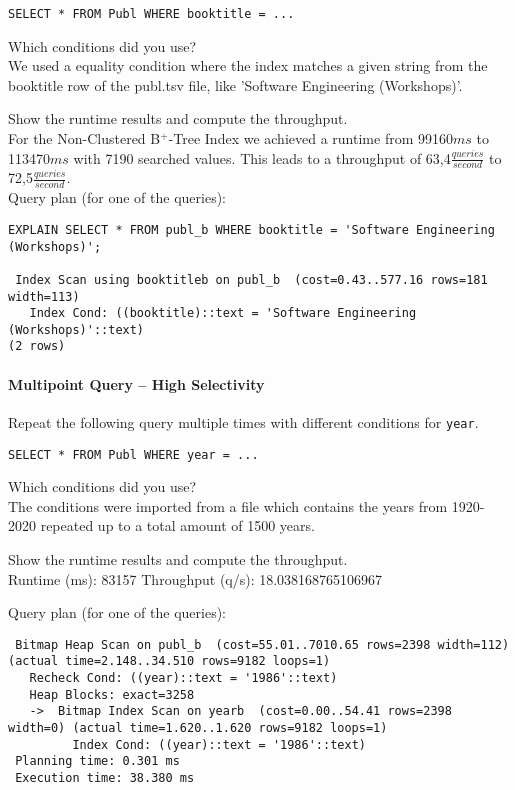\documentclass[11pt]{scrartcl}
\begin{document}
{\small
\begin{verbatim}
SELECT * FROM Publ WHERE booktitle = ...
\end{verbatim}
}

\noindent
Which conditions did you use?\\
We used a equality condition where the index matches a given string from the booktitle row of the publ.tsv file, like 'Software Engineering (Workshops)'.

\smallskip\noindent
Show the runtime results and compute the throughput.\\
For the Non-Clustered B$^+$-Tree Index we achieved a runtime from 99160$ms$ to 113470$ms$ with 7190 searched values.
This leads to a throughput of 63,4$\frac{queries}{second}$ to 72,5$\frac{queries}{second}$.\\

\smallskip\noindent
Query plan (for one of the queries):
\begin{verbatim}
EXPLAIN SELECT * FROM publ_b WHERE booktitle = 'Software Engineering (Workshops)';

 Index Scan using booktitleb on publ_b  (cost=0.43..577.16 rows=181 width=113)
   Index Cond: ((booktitle)::text = 'Software Engineering (Workshops)'::text)
(2 rows)
\end{verbatim}



\paragraph{Multipoint Query -- High Selectivity}

Repeat the following query multiple times with different conditions for {\tt year}.

{\small
\begin{verbatim}
SELECT * FROM Publ WHERE year = ...
\end{verbatim}
}

\noindent
Which conditions did you use?\\
The conditions were imported from a file which contains the years from 1920-2020 repeated up to a total amount of 1500 years.

\smallskip\noindent
Show the runtime results and compute the throughput.\\
Runtime (ms): 83157
Throughput (q/s): 18.038168765106967

\smallskip\noindent
Query plan (for one of the queries):
{\small
\begin{verbatim}
 Bitmap Heap Scan on publ_b  (cost=55.01..7010.65 rows=2398 width=112) (actual time=2.148..34.510 rows=9182 loops=1)
   Recheck Cond: ((year)::text = '1986'::text)
   Heap Blocks: exact=3258
   ->  Bitmap Index Scan on yearb  (cost=0.00..54.41 rows=2398 width=0) (actual time=1.620..1.620 rows=9182 loops=1)
         Index Cond: ((year)::text = '1986'::text)
 Planning time: 0.301 ms
 Execution time: 38.380 ms
\end{verbatim}
}
\end{document}
